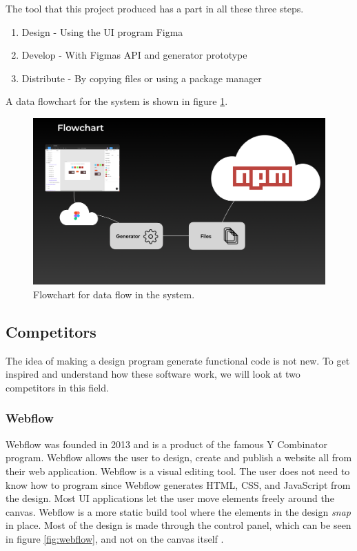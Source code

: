 The tool that this project produced has a part in all these three steps. 
\begin{enumerate}
  \item Design - Using the UI program Figma
  \item Develop - With Figmas API and generator prototype
  \item Distribute - By copying files or using a package manager 
\end{enumerate}
A data flowchart for the system is shown in figure \ref{fig:flow}.

\begin{figure}[H]
  \centering
  \includegraphics[width=0.8\linewidth]{images/flow.png}
  \caption{Flowchart for data flow in the system. }%
  \label{fig:flow}
\end{figure}




\subsection{Competitors}%
\label{sub:Competitors}
The idea of making a design program generate functional code is not new. To get inspired and understand how these software work, we will look at two competitors in this field. 

\subsubsection{Webflow}
Webflow was founded in 2013 and is a product of the famous Y Combinator program. Webflow allows the user to design, create and publish a website all from their web application. Webflow is a visual editing tool. The user does not need to know how to program since Webflow generates HTML, CSS, and JavaScript from the design. Most UI applications let the user move elements freely around the canvas. Webflow is a more static build tool where the elements in the design \textit{snap} in place. Most of the design is made through the control panel, which can be seen in figure \ref{fig:webflow}, and not on the canvas itself \cite{ResponsiveWebDesign}. 


